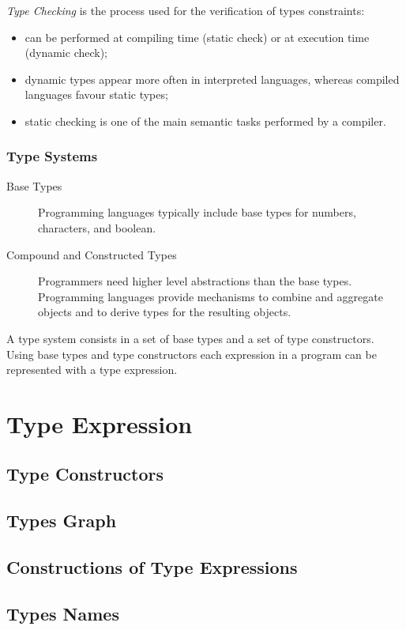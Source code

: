 \emph{Type Checking} is the process used for the verification of types constraints:
\begin{itemize}
	\item
	can be performed at compiling time (static check) or at execution time (dynamic check);
	\item
	dynamic types appear more often in interpreted languages, whereas compiled languages favour static types;
	\item
	static checking is one of the main semantic tasks performed by a compiler.
\end{itemize}
\subsubsection{Type Systems}
\begin{description}
	\item[Base Types]
	Programming languages typically include base types for numbers, characters, and boolean.
	\item[Compound and Constructed Types]
	Programmers need higher level abstractions than the base types.
	Programming languages provide mechanisms to combine and aggregate objects and to derive types for the resulting objects.
\end{description}
A type system consists in a set of base types and a set of type constructors.
Using base types and type constructors each expression in a program can be represented with a type expression.

\section{Type Expression}

\subsection{Type Constructors}

\subsection{Types Graph}

\subsection{Constructions of Type Expressions}

\subsection{Types Names}

